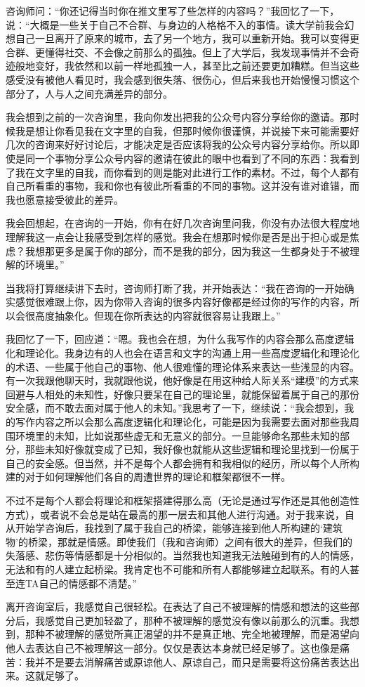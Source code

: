 咨询师问：“你还记得当时你在推文里写了些怎样的内容吗？”我回忆了一下，说：“大概是一些关于自己不合群、与身边的人格格不入的事情。读大学前我会幻想自己一旦离开了原来的城市，去了另一个地方，我可以重新开始。我可以变得更合群、更懂得社交、不会像之前那么的孤独。但上了大学后，我发现事情并不会奇迹般地变好，我依然和以前一样地孤独一人，甚至比之前还要更加糟糕。但当这些感受没有被他人看见时，我会感到很失落、很伤心，但后来我也开始慢慢习惯这个部分了，人与人之间充满差异的部分。

我会想到之前的一次咨询里，我向你发出把我的公众号内容分享给你的邀请。那时候我是想让你看见我在文字里的自我，但那时候你很谨慎，并说接下来可能需要好几次的咨询来好好讨论后，才能决定是否应该将我的公众号内容分享给你。所以即使是同一个事物\pozhehao{}分享公众号内容的邀请\pozhehao{}在彼此的眼中也看到了不同的东西：我看到了我在文字里的自我，而你看到的则是能对此进行工作的素材。不过，每个人都有自己所看重的事物，我和你也有彼此所看重的不同的事物。这并没有谁对谁错，而我也愿意接受彼此的差异。

我会回想起，在咨询的一开始，你有在好几次咨询里问我，你没有办法很大程度地理解我这一点会让我感受到怎样的感觉。我会在想那时候你是否是出于担心或是焦虑？我想那更多是属于你的部分，而不是我的部分，因为我这一生都身处于不被理解的环境里。”

\tristarsepline

当我将打算继续讲下去时，咨询师打断了我，并开始表达：“我在咨询的一开始确实感觉很难跟上你，因为你带入咨询的很多内容好像都是经过你的写作的内容，所以会很高度抽象化。但现在你所表达的内容就很容易让我跟上。”

我回忆了一下，回应道：“嗯。我也会在想，为什么我写作的内容会那么高度逻辑化和理论化。我身边有的人也会在语言和文字的沟通上用一些高度逻辑化和理论化的术语、一些属于他自己的事物、他人很难懂的理论体系来表达一些浅显的内容。有一次我跟他聊天时，我就跟他说，他好像是在用这种给人际关系“建模”的方式来回避与人相处的未知性，好像只要呆在自己的理论里，就能保留着属于自己的那份安全感，而不敢去面对属于他人的未知。”我思考了一下，继续说：“我会想到，我的写作内容之所以会那么高度逻辑化和理论化，可能是因为我需要去面对那些我周围环境里的未知，比如说那些虚无和无意义的部分。一旦能够命名那些未知的部分，那些未知好像就变成了已知，我好像也就能从这些逻辑和理论里找到一份属于自己的安全感。但当然，并不是每个人都会拥有和我相似的经历，所以每个人所构建的对于如何理解他们各自的周遭世界的理论和框架都很不一样。

不过不是每个人都会将理论和框架搭建得那么高（无论是通过写作还是其他创造性方式），或者说不会总是站在最高的那一层去和其他人进行沟通。对于我来说，自从开始学咨询后，我找到了属于我自己的桥梁，能够连接到他人所构建的‘建筑物’的桥梁，那就是情感。即使我们（我和咨询师）之间有很大的差异，但我们的失落感、悲伤等情感都是十分相似的。当然我也知道我无法触碰到有的人的情感，无法和有的人建立起桥梁。我肯定也不可能和所有人都能够建立起联系。有的人甚至连TA自己的情感都不清楚。”

\tristarsepline

离开咨询室后，我感觉自己很轻松。在表达了自己不被理解的情感和想法的这些部分后，我感觉自己更加轻盈了，那种不被理解的感觉没有像以前那么的沉重。我想到，那种不被理解的感觉所真正渴望的并不是真正地、完全地被理解，而是渴望向他人去表达自己不被理解这一部分。仅仅是表达本身就已经足够了。这也像是痛苦：我并不是要去消解痛苦或原谅他人、原谅自己，而只是需要将这份痛苦表达出来。这就足够了。

